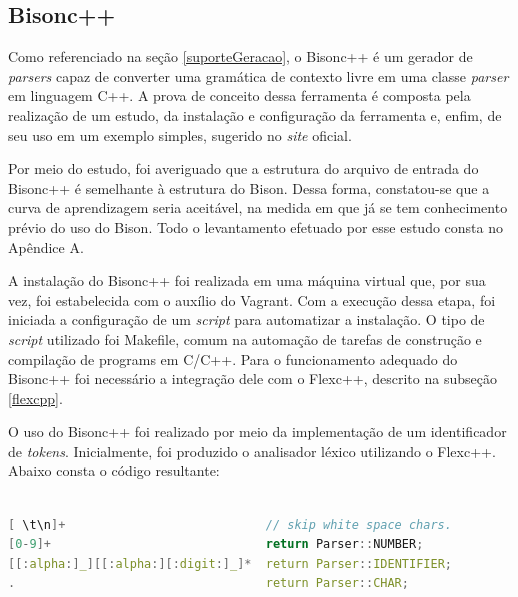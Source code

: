 \subsection{Bisonc++}
Como referenciado na seção \ref{suporteGeracao}, o Bisonc++ é um gerador de \textit{parsers} capaz de converter uma gramática de contexto livre em uma classe \textit{parser} em linguagem C++. A prova de conceito dessa ferramenta é composta pela realização de um estudo, da instalação e configuração da ferramenta e, enfim, de seu uso em um exemplo simples, sugerido no \textit{site} oficial.
\par
\indent Por meio do estudo, foi averiguado que a estrutura do arquivo de entrada do Bisonc++ é semelhante à estrutura do Bison. Dessa forma, constatou-se que a curva de aprendizagem seria aceitável, na medida em que já se tem conhecimento prévio do uso do Bison. Todo o levantamento efetuado por esse estudo consta no Apêndice A.
\par
\indent A instalação do Bisonc++ foi realizada em uma máquina virtual que, por sua vez, foi estabelecida com o auxílio do Vagrant. Com a execução dessa etapa, foi iniciada a configuração de um \textit{script} para automatizar a instalação. O tipo de \textit{script} utilizado foi Makefile, comum na automação de tarefas de construção e compilação de programs em C/C++. Para o funcionamento adequado do Bisonc++ foi necessário a integração dele com o Flexc++, descrito na subseção \ref{flexcpp}.
\par
\indent O uso do Bisonc++ foi realizado por meio da implementação de um identificador de \textit{tokens}. Inicialmente, foi produzido o analisador léxico utilizando o Flexc++. Abaixo consta o código resultante:

\begin{lstlisting}[language=c, label=analisadorLexicoPCB, caption=Analisador Léxico da Prova de Conceito do Bisonc++]
%%

[ \t\n]+                            // skip white space chars.
[0-9]+                              return Parser::NUMBER;
[[:alpha:]_][[:alpha:][:digit:]_]*  return Parser::IDENTIFIER;
.                                   return Parser::CHAR;
\end{lstlisting}


